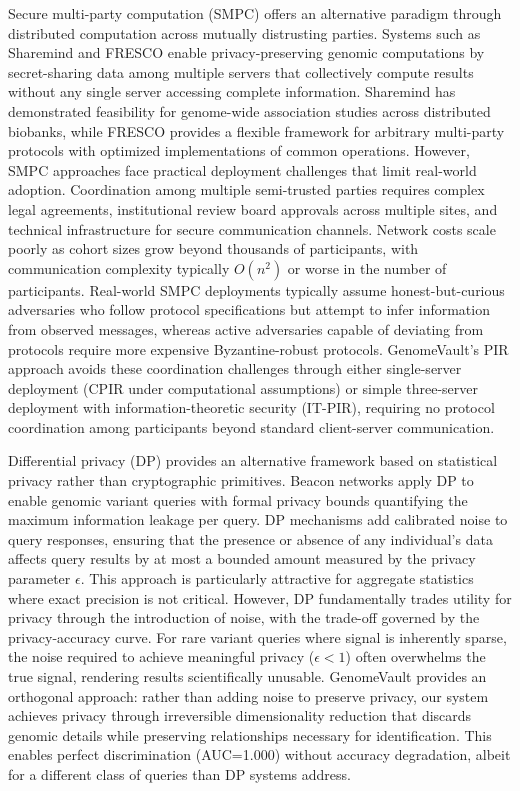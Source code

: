 \documentclass[11pt,letterpaper]{article}
\begin{document}
Secure multi-party computation (SMPC) offers an alternative paradigm through distributed computation across mutually distrusting parties. Systems such as Sharemind \cite{kamm2013} and FRESCO \cite{keller2020} enable privacy-preserving genomic computations by secret-sharing data among multiple servers that collectively compute results without any single server accessing complete information. Sharemind has demonstrated feasibility for genome-wide association studies across distributed biobanks, while FRESCO provides a flexible framework for arbitrary multi-party protocols with optimized implementations of common operations. However, SMPC approaches face practical deployment challenges that limit real-world adoption. Coordination among multiple semi-trusted parties requires complex legal agreements, institutional review board approvals across multiple sites, and technical infrastructure for secure communication channels. Network costs scale poorly as cohort sizes grow beyond thousands of participants, with communication complexity typically $O(n^2)$ or worse in the number of participants. Real-world SMPC deployments typically assume honest-but-curious adversaries who follow protocol specifications but attempt to infer information from observed messages, whereas active adversaries capable of deviating from protocols require more expensive Byzantine-robust protocols. GenomeVault's PIR approach avoids these coordination challenges through either single-server deployment (CPIR under computational assumptions) or simple three-server deployment with information-theoretic security (IT-PIR), requiring no protocol coordination among participants beyond standard client-server communication.

Differential privacy (DP) provides an alternative framework based on statistical privacy rather than cryptographic primitives. Beacon networks \cite{raisaro2018} apply DP to enable genomic variant queries with formal privacy bounds quantifying the maximum information leakage per query. DP mechanisms add calibrated noise to query responses, ensuring that the presence or absence of any individual's data affects query results by at most a bounded amount measured by the privacy parameter $\epsilon$. This approach is particularly attractive for aggregate statistics where exact precision is not critical. However, DP fundamentally trades utility for privacy through the introduction of noise, with the trade-off governed by the privacy-accuracy curve. For rare variant queries where signal is inherently sparse, the noise required to achieve meaningful privacy ($\epsilon < 1$) often overwhelms the true signal, rendering results scientifically unusable. GenomeVault provides an orthogonal approach: rather than adding noise to preserve privacy, our system achieves privacy through irreversible dimensionality reduction that discards genomic details while preserving relationships necessary for identification. This enables perfect discrimination (AUC=1.000) without accuracy degradation, albeit for a different class of queries than DP systems address.
\end{document}
